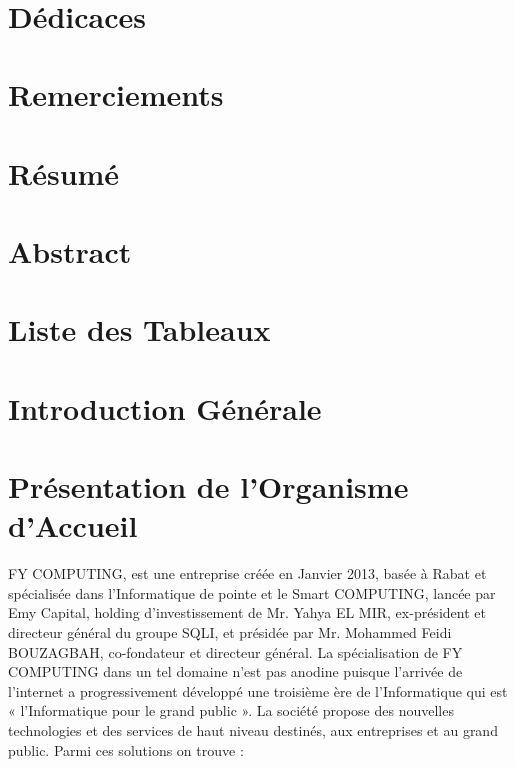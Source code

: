 \documentclass[a4paper,11pt,oneside]{report}
\begin{document}
\makeatother

\newpage

\ \newline

\newpage

\chapter*{Dédicaces}

\newpage

\chapter*{Remerciements}

\newpage

\chapter*{Résumé}

\newpage

\chapter*{Abstract}

\newpage

\tableofcontents

\newpage

\listoffigures

\newpage

\chapter*{Liste des Tableaux}

\newpage

\chapter*{Introduction Générale}

\newpage

\chapter{Présentation de l'Organisme d'Accueil}

\newpage

FY COMPUTING, est  une entreprise créée en Janvier 2013, basée à Rabat et spécialisée dans l’Informatique de pointe et le Smart COMPUTING, lancée par Emy Capital, holding d’investissement de  Mr. Yahya EL MIR, ex-président et directeur général du groupe SQLI, et présidée par  Mr. Mohammed Feidi BOUZAGBAH, co-fondateur et directeur général. 
\newline
\newline
La spécialisation de FY COMPUTING dans un tel domaine n’est pas anodine puisque l’arrivée de l’internet a progressivement développé une troisième ère de l’Informatique qui est « l’Informatique pour le grand public ».          
\newline
\newline
La  société propose des nouvelles technologies et des services de haut niveau destinés, aux entreprises et au grand public. Parmi ces solutions on trouve :
\end{document}
